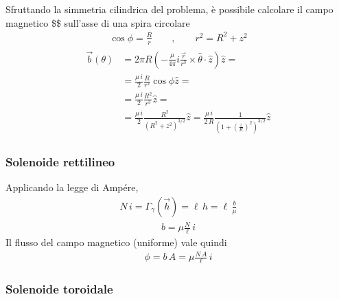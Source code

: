 \documentclass[letterpaper,10pt,italian]{jupyterBook}
\begin{document}
\sphinxAtStartPar
Sfruttando la simmetria cilindrica del problema, è possibile calcolare il campo magnetico \$\$ sull’asse di una spira circolare
\begin{equation*}
\begin{split}\cos \phi = \frac{R}{r} \qquad , \qquad
r^2 = R^2 + z^2\end{split}
\end{equation*}\begin{equation*}
\begin{split}\begin{aligned}
  \vec{b}(\theta) & = 2 \pi R \left( -\frac{\mu}{4 \pi} i \frac{\vec{r}}{r^3} \times \hat{\theta} \cdot \hat{z} \right) \hat{z} = \\
   & = \frac{\mu \, i}{2} \frac{R}{r^2} \cos \phi \hat{z} = \\
   & = \frac{\mu \, i}{2} \frac{R^2}{r^3} \hat{z}  = \\
   & = \frac{\mu \, i}{2} \frac{R^2}{(R^2 + z^2)^{3/2}} \hat{z}  =
       \frac{\mu \, i}{2 \, R} \frac{1}{\left(1 + \left(\frac{z}{R}\right)^2 \right)^{3/2}} \hat{z} 
\end{aligned}\end{split}
\end{equation*}\subsubsection*{Solenoide rettilineo}

\sphinxAtStartPar
Applicando la legge di Ampére,
\begin{equation*}
\begin{split} N \, i = \Gamma_{\gamma}(\vec{h}) = \ell \, h = \ell \, \frac{b}{\mu}\end{split}
\end{equation*}\begin{equation*}
\begin{split}b = \mu \frac{N}{\ell} \, i\end{split}
\end{equation*}
\sphinxAtStartPar
Il flusso del campo magnetico (uniforme) vale quindi
\begin{equation*}
\begin{split}\phi = b \, A = \mu \frac{N \, A}{\ell} \, i\end{split}
\end{equation*}\subsubsection*{Solenoide toroidale}
\end{document}
